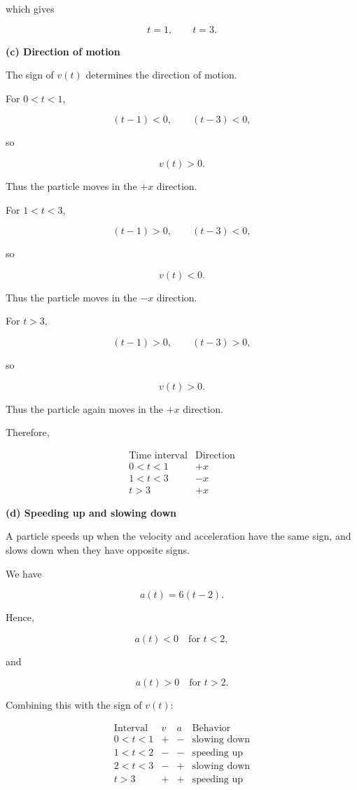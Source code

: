 \documentclass[12pt]{article}
\theoremstyle{remark}
\begin{document}
which gives

\[
\boxed{
t=1,\qquad t=3.
}
\]

\textbf{(c) Direction of motion}

The sign of \(v(t)\) determines the direction of motion.

For \(0<t<1\),

\[
(t-1)<0,\qquad (t-3)<0,
\]

so

\[
v(t)>0.
\]

Thus the particle moves in the \(+x\) direction.

For \(1<t<3\),

\[
(t-1)>0,\qquad (t-3)<0,
\]

so

\[
v(t)<0.
\]

Thus the particle moves in the \(-x\) direction.

For \(t>3\),

\[
(t-1)>0,\qquad (t-3)>0,
\]

so

\[
v(t)>0.
\]

Thus the particle again moves in the \(+x\) direction.

Therefore,

\[
\boxed{
\begin{array}{c|c}
\text{Time interval} & \text{Direction} \\ \hline
0<t<1 & +x\\
1<t<3 & -x\\
t>3 & +x
\end{array}
}
\]

\textbf{(d) Speeding up and slowing down}

A particle speeds up when the velocity and acceleration have the same sign, and slows down when they have opposite signs.

We have

\[
a(t)=6(t-2).
\]

Hence,

\[
a(t)<0 \quad \text{for }t<2,
\]

and

\[
a(t)>0 \quad \text{for }t>2.
\]

Combining this with the sign of \(v(t)\):

\[
\begin{array}{c|c|c|c}
\text{Interval} & v & a & \text{Behavior} \\ \hline
0<t<1 & + & - & \text{slowing down}\\
1<t<2 & - & - & \text{speeding up}\\
2<t<3 & - & + & \text{slowing down}\\
t>3 & + & + & \text{speeding up}
\end{array}
\]
\end{document}
